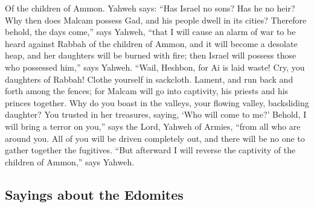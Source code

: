  Of the children of Ammon. Yahweh says: ``Has Israel no
sons? Has he no heir? Why then does Malcam possess Gad, and his people
dwell in its cities?  Therefore behold, the days come,''
says Yahweh, ``that I will cause an alarm of war to be heard against
Rabbah of the children of Ammon, and it will become a desolate heap, and
her daughters will be burned with fire; then Israel will possess those
who possessed him,'' says Yahweh.  ``Wail, Heshbon, for Ai
is laid waste! Cry, you daughters of Rabbah! Clothe yourself in
sackcloth. Lament, and run back and forth among the fences; for Malcam
will go into captivity, his priests and his princes together.
 Why do you boast in the valleys, your flowing valley,
backsliding daughter? You trusted in her treasures, saying, `Who will
come to me?'  Behold, I will bring a terror on you,'' says
the Lord, Yahweh of Armies, ``from all who are around you. All of you
will be driven completely out, and there will be no one to gather
together the fugitives.  ``But afterward I will reverse
the captivity of the children of Ammon,'' says Yahweh.

\hypertarget{sayings-about-the-edomites}{%
\subsection{Sayings about the
Edomites}\label{sayings-about-the-edomites}}

